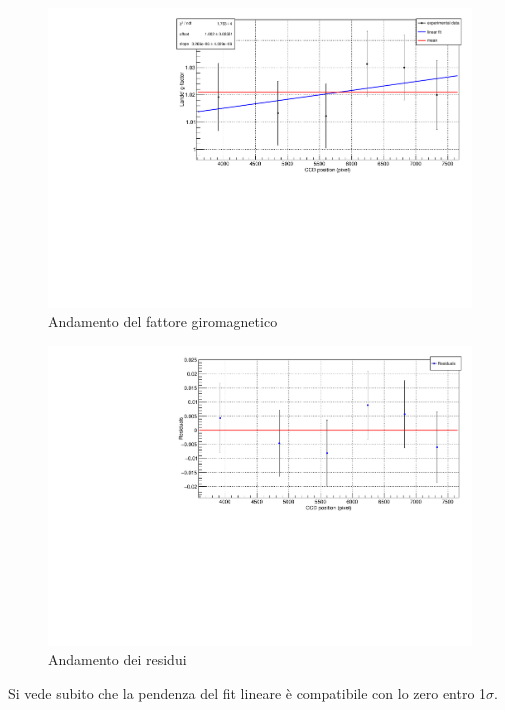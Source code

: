 \documentclass{article}
\begin{document}
	\begin{center}
		\begin{figure}[H]
			\centering
			\includegraphics[scale=0.38, angle=0]{campomax/g.pdf}
			\caption{Andamento del fattore giromagnetico}
			\label{fig:g}
		\end{figure}
	\end{center}

	\begin{center}
		\begin{figure}[H]
			\centering
			\includegraphics[scale=0.38, angle=0]{campomax/g_residuals.pdf}
			\caption{Andamento dei residui}
			\label{fig:g_res}
		\end{figure}
	\end{center}

	Si vede subito che la pendenza del fit lineare è compatibile con lo zero entro 1$\sigma$. 
	
\end{document}
